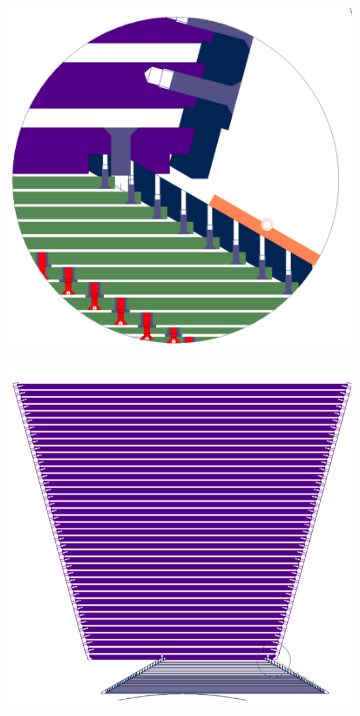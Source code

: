 \begin{figure}
	\begin{subfigure}[b]{.49\textwidth}
		\includegraphics[width=\linewidth]{Calorimeter/SiliconTungstenSiD/edgeFasteners}
		\caption{}
		\label{fig:Calorimeter:SiDECAL:edgeFasteners}
	\end{subfigure}\hfill
	\begin{subfigure}[b]{.49\textwidth}
		\includegraphics[width=\linewidth]{Calorimeter/SiliconTungstenSiD/ecalMounting}
		\caption{}
		\label{fig:Calorimeter:SiDECAL:ecalMounting}
	\end{subfigure}
\end{figure}
